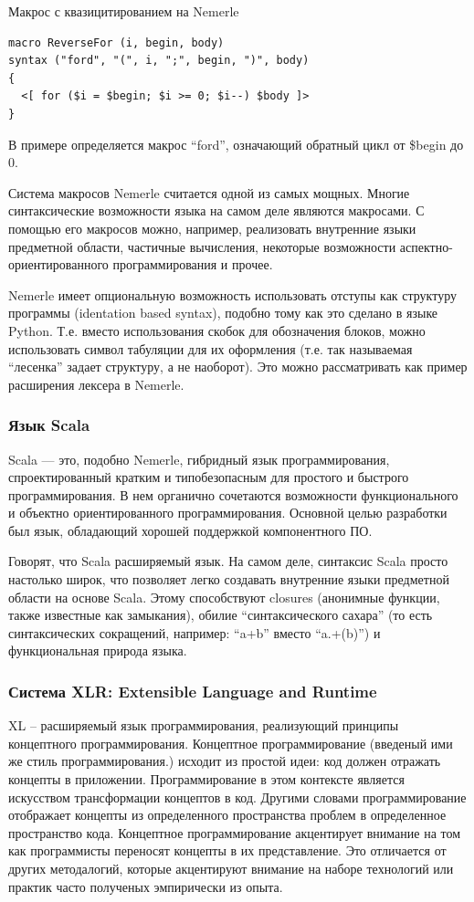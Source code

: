 \documentclass[a4paper,12pt]{article}
\begin{document}
\begin{example}
Макрос с квазицитированием на Nemerle
\end{example}
\begin{verbatim}
macro ReverseFor (i, begin, body) 
syntax ("ford", "(", i, ";", begin, ")", body)
{
  <[ for ($i = $begin; $i >= 0; $i--) $body ]>
}
\end{verbatim}
В примере определяется макрос ``ford'', означающий обратный цикл от \$begin до
0.

Система макросов Nemerle считается одной из самых мощных. Многие
синтаксические возможности языка на самом деле являются макросами. С помощью
его макросов можно, например, реализовать внутренние языки предметной области,
частичные вычисления, некоторые возможности аспектно-ориентированного
программирования и прочее.

Nemerle имеет опциональную возможность использовать отступы как структуру
программы (identation based syntax), подобно тому как это сделано в языке
Python. Т.е. вместо использования скобок для обозначения блоков, можно
использовать символ табуляции для их оформления (т.е. так называемая
``лесенка'' задает структуру, а не наоборот). Это можно рассматривать как
пример расширения лексера в Nemerle.

\subsubsection*{Язык Scala}
Scala — это, подобно Nemerle, гибридный язык программирования, спроектированный
кратким и типобезопасным для простого и быстрого программирования. В нем органично
сочетаются возможности функционального и объектно ориентированного
программирования. Основной целью разработки был язык, обладающий хорошей
поддержкой компонентного ПО.

Говорят, что Scala расширяемый язык. На самом деле, синтаксис Scala просто
настолько широк, что позволяет легко создавать внутренние языки предметной
области на основе Scala. Этому способствуют closures (анонимные функции, также
известные как замыкания), обилие ``синтаксического сахара'' (то есть
синтаксических сокращений, например: ``a+b'' вместо ``a.+(b)'') и
функциональная природа языка.

\subsubsection*{Система XLR: Extensible Language and Runtime}
\label{xlr}
XL -- расширяемый язык программирования, реализующий принципы концептного
программирования. Концептное программирование (введеный ими же стиль
программирования.) исходит из простой идеи: код должен отражать концепты в
приложении. Программирование в этом контексте является искусством трансформации
концептов в код. Другими словами программирование отображает концепты из
определенного пространства проблем в определенное пространство кода. Концептное
программирование акцентирует внимание на том как программисты переносят
концепты в их представление. Это отличается от других методалогий, которые
акцентируют внимание на наборе технологий или практик часто полученых
эмпирически из опыта.
\end{document}
